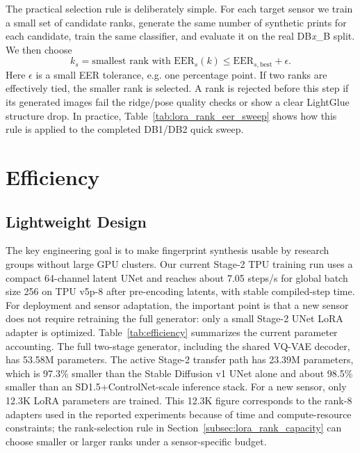 \documentclass{article}
\begin{document}
The practical selection rule is deliberately simple.  For each target sensor we
train a small set of candidate ranks, generate the same number of synthetic
prints for each candidate, train the same classifier, and evaluate it on the
real DB\emph{x}\_B split.  We then choose
\begin{equation}
    k_s = \text{smallest rank with }
    \mathrm{EER}_s(k) \le \mathrm{EER}_{s,\mathrm{best}} + \epsilon .
    \label{eq:lora_rank_selection}
\end{equation}
Here $\epsilon$ is a small EER tolerance, e.g. one percentage point.  If two
ranks are effectively tied, the smaller rank is selected.  A rank is rejected
before this step if its generated images fail the ridge/pose quality checks or
show a clear LightGlue structure drop.  In practice,
Table~\ref{tab:lora_rank_eer_sweep} shows how this rule is applied to the
completed DB1/DB2 quick sweep.

\section{Efficiency}
\label{sec:efficiency}

\subsection{Lightweight Design}

The key engineering goal is to make fingerprint synthesis usable by research
groups without large GPU clusters.  Our current Stage-2 TPU training run uses a
compact 64-channel latent UNet and reaches about 7.05 steps/s for global batch
size 256 on TPU v5p-8 after pre-encoding latents, with stable compiled-step
time.  For deployment and sensor adaptation, the important point is that a new
sensor does not require retraining the full generator: only a small Stage-2
UNet LoRA adapter is optimized.  Table~\ref{tab:efficiency} summarizes the
current parameter accounting.  The full two-stage generator, including the
shared VQ-VAE decoder, has 53.58M parameters.  The active Stage-2 transfer path
has 23.39M parameters, which is 97.3\% smaller than the Stable Diffusion v1
UNet alone and about 98.5\% smaller than an SD1.5+ControlNet-scale inference
stack.  For a new sensor, only 12.3K LoRA parameters are trained.
This 12.3K figure corresponds to the rank-8 adapters used in the reported
experiments because of time and compute-resource constraints; the rank-selection rule in
Section~\ref{subsec:lora_rank_capacity} can choose smaller or larger ranks under a
sensor-specific budget.
\end{document}
